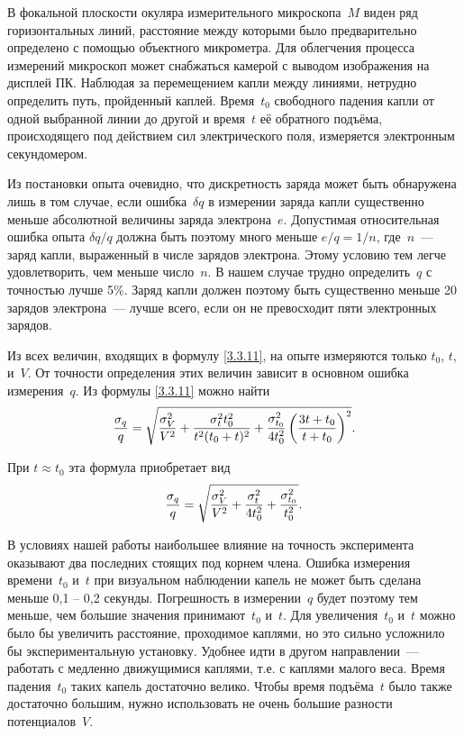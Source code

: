 В фокальной плоскости окуляра измерительного микроскопа~$M$ виден ряд
горизонтальных линий, расстояние между которыми было предварительно определено с
помощью объектного микрометра. Для облегчения процесса измерений микроскоп может
снабжаться камерой с выводом изображения на дисплей ПК. Наблюдая за перемещением
капли между линиями, нетрудно определить путь, пройденный каплей. Время~$t_0$
свободного падения капли от одной выбранной линии до другой и время~$t$ её
обратного подъёма, происходящего под действием сил электрического поля,
измеряется электронным секундомером.

Из постановки опыта очевидно, что дискретность заряда может быть обнаружена лишь
в том случае, если ошибка~$\delta q$ в измерении заряда капли существенно меньше
абсолютной величины заряда электрона~$e$. Допустимая относительная ошибка опыта
$\delta q/q$ должна быть поэтому много меньше $e/q=1/n$, где~$n$~--- заряд
капли, выраженный в числе зарядов электрона. Этому условию тем легче
удовлетворить, чем меньше число~$n$. В нашем случае трудно определить~$q$ с
точностью лучше 5\%. Заряд капли должен поэтому быть существенно меньше 20
зарядов электрона~--- лучше всего, если он не превосходит пяти электронных
зарядов.

Из всех величин, входящих в формулу \eqref{3.3.11}, на опыте измеряются только
$t_0$, $t$, и~$V$. От точности определения этих величин зависит в основном
ошибка измерения~$q$. Из формулы \eqref{3.3.11} можно найти
\begin{equation}
	\frac{\sigma_q}{q}=\sqrt{\frac{\sigma^2_V}{V^2}+\frac{\sigma^2_t
t_0^2}{t^2(t_0+t)^2}+
	\frac{\sigma^2_{t_0}}{4t^2_0}\left(\frac{3t+t_0} {t+t_0}\right)^2}.
	\eqmark{3.3.12}
\end{equation}

При $t\approx t_0$ эта формула приобретает вид
\begin{equation}
	\frac{\sigma_q}{q}=\sqrt{\frac{\sigma^2_V}{V^2}+ \frac{\sigma^2_t}{4t^2_0}+
\frac{\sigma^2_{t_0}}{t^2_0}}.
	\eqmark{3.3.13}
\end{equation}

В условиях нашей работы наибольшее влияние на точность эксперимента оказывают
два последних стоящих под корнем члена. Ошибка измерения времени~$t_0$ и~$t$ при
визуальном наблюдении капель не может быть сделана меньше 0,1 -- 0,2 секунды.
Погрешность в измерении~$q$ будет поэтому тем меньше, чем большие значения
принимают~$t_0$ и~$t$. Для увеличения~$t_0$ и~$t$ можно было бы увеличить
расстояние, проходимое каплями, но это сильно усложнило бы экспериментальную
установку. Удобнее идти в другом направлении~--- работать с медленно движущимися
каплями, т.е. с каплями малого веса. Время падения~$t_0$ таких капель достаточно
велико. Чтобы время подъёма~$t$ было также достаточно большим, нужно
использовать не очень большие разности потенциалов~$V$.

